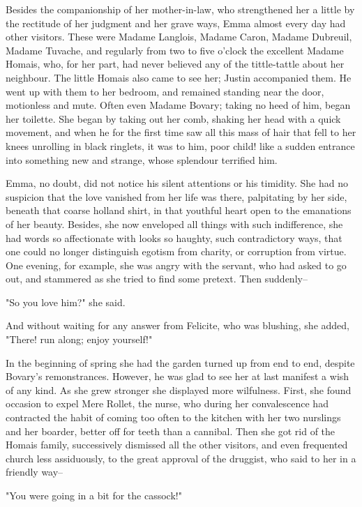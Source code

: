 \documentclass{tufte-book}
\begin{document}
Besides the companionship of her mother-in-law, who strengthened her a
little by the rectitude of her judgment and her grave ways, Emma almost
every day had other visitors. These were Madame Langlois, Madame Caron,
Madame Dubreuil, Madame Tuvache, and regularly from two to five o'clock
the excellent Madame Homais, who, for her part, had never believed any
of the tittle-tattle about her neighbour. The little Homais also came to
see her; Justin accompanied them. He went up with them to her bedroom,
and remained standing near the door, motionless and mute. Often even
Madame Bovary; taking no heed of him, began her toilette. She began by
taking out her comb, shaking her head with a quick movement, and when
he for the first time saw all this mass of hair that fell to her knees
unrolling in black ringlets, it was to him, poor child! like a sudden
entrance into something new and strange, whose splendour terrified him.

Emma, no doubt, did not notice his silent attentions or his timidity.
She had no suspicion that the love vanished from her life was there,
palpitating by her side, beneath that coarse holland shirt, in that
youthful heart open to the emanations of her beauty. Besides, she
now enveloped all things with such indifference, she had words so
affectionate with looks so haughty, such contradictory ways, that one
could no longer distinguish egotism from charity, or corruption from
virtue. One evening, for example, she was angry with the servant, who
had asked to go out, and stammered as she tried to find some pretext.
Then suddenly--

"So you love him?" she said.

And without waiting for any answer from Felicite, who was blushing, she
added, "There! run along; enjoy yourself!"

In the beginning of spring she had the garden turned up from end to end,
despite Bovary's remonstrances. However, he was glad to see her at last
manifest a wish of any kind. As she grew stronger she displayed more
wilfulness. First, she found occasion to expel Mere Rollet, the nurse,
who during her convalescence had contracted the habit of coming too
often to the kitchen with her two nurslings and her boarder, better
off for teeth than a cannibal. Then she got rid of the Homais family,
successively dismissed all the other visitors, and even frequented
church less assiduously, to the great approval of the druggist, who said
to her in a friendly way--

"You were going in a bit for the cassock!"
\end{document}
